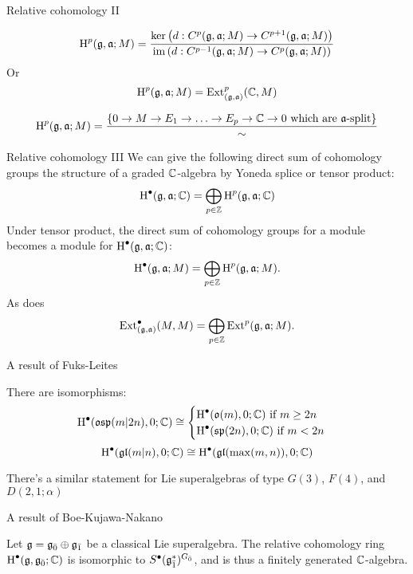 \documentclass{beamer}
\begin{document}
\begin{frame}{Relative cohomology II}\pause
  \begin{definition}
    \[
      \operatorname{H}^p(\mathfrak{g},\mathfrak{a};M) = \frac{\ker\left(d:C^p(\mathfrak{g},\mathfrak{a};M) \to C^{p+1}(\mathfrak{g},\mathfrak{a};M)\right)}{\operatorname{im}\left(d: C^{p-1}(\mathfrak{g},\mathfrak{a};M) \to C^p(\mathfrak{g},\mathfrak{a};M)\right)}
    \]
    \pause Or
    \[
      \operatorname{H}^p(\mathfrak{g},\mathfrak{a};M) = \operatorname{Ext}^p_{(\mathfrak{g},\mathfrak{a})}(\mathbb{C},M)
    \]
  \end{definition}\pause
  \[
    \operatorname{H}^p(\mathfrak{g},\mathfrak{a};M) = \frac{\left\{0 \to M \to E_1 \to \ldots \to E_p \to \mathbb{C} \to 0 \text{ which are $\mathfrak{a}$-split}\right\}}{\sim}
  \]
\end{frame}

\begin{frame}{Relative cohomology III}\pause
  We can give the following direct sum of cohomology groups the structure of a graded $\mathbb{C}$-algebra by Yoneda splice or tensor product:
  \[
    \operatorname{H}^\bullet(\mathfrak{g},\mathfrak{a};\mathbb{C}) = \bigoplus_{p \in \mathbb{Z}} \operatorname{H}^p(\mathfrak{g},\mathfrak{a};\mathbb{C})
  \]\pause
  Under tensor product, the direct sum of cohomology groups for a module becomes a module for $\operatorname{H}^\bullet(\mathfrak{g},\mathfrak{a};\mathbb{C})$:
  \[
    \operatorname{H}^\bullet(\mathfrak{g},\mathfrak{a};M) = \bigoplus_{p \in \mathbb{Z}} \operatorname{H}^p(\mathfrak{g},\mathfrak{a};M).
  \]\pause
  As does
  \[
    \operatorname{Ext}^\bullet_{(\mathfrak{g},\mathfrak{a})}(M,M) = \bigoplus_{p \in \mathbb{Z}} \operatorname{Ext}^p(\mathfrak{g},\mathfrak{a};M).
  \]
  
\end{frame}

\begin{frame}{A result of Fuks-Leites}\pause
  \begin{theorem}
    There are isomorphisms:
    \[
      \operatorname{H}^\bullet(\mathfrak{osp}(m|2n),0;\mathbb{C}) \cong
      \begin{cases}
        \operatorname{H}^\bullet(\mathfrak{o}(m),0;\mathbb{C}) \text{ if } m \geq 2n \\
        \operatorname{H}^\bullet(\mathfrak{sp}(2n),0;\mathbb{C}) \text{ if } m < 2n
      \end{cases}
    \]
    \[
      \operatorname{H}^\bullet(\mathfrak{gl}(m|n),0;\mathbb{C}) \cong \operatorname{H}^\bullet(\mathfrak{gl}(\max(m,n)),0;\mathbb{C})
    \]
  \end{theorem}\pause
  There's a similar statement for Lie superalgebras of type $G(3)$, $F(4)$, and $D(2,1;\alpha)$
\end{frame}

\begin{frame}{A result of Boe-Kujawa-Nakano}

  \begin{theorem}
    Let $\mathfrak{g} = {\mathfrak{g}}_{\bar{0}} \oplus {\mathfrak{g}}_{\bar{1}}$ be a classical Lie superalgebra. The relative cohomology ring $\operatorname{H}^\bullet(\mathfrak{g},{\mathfrak{g}}_{\bar{0}};\mathbb{C})$ is isomorphic to $S^\bullet({\mathfrak{g}}_{\bar{1}}^*)^{{G}_{\bar{0}}}$, and is thus a finitely generated $\mathbb{C}$-algebra.
  \end{theorem}
\end{frame}
\end{document}
